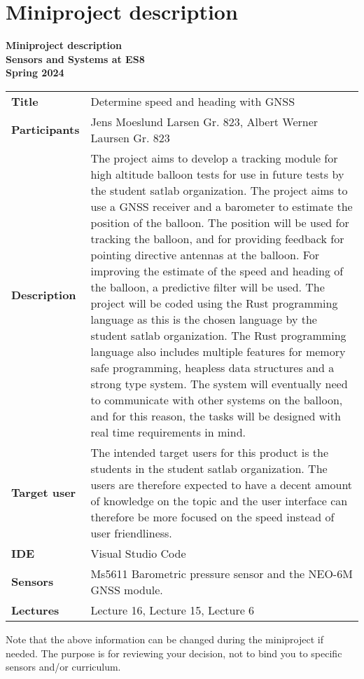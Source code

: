 \chapter{Miniproject description}\label{ch:miniproject_description}
\begin{center}
    \bf
    Miniproject description \\ Sensors and Systems at ES8 \\Spring 2024
    \end{center}
    
    \begin{tabularx}{\linewidth}{lX}
    \bf Title & Determine speed and heading with GNSS \\
    \bf Participants & Jens Moeslund Larsen Gr. 823, Albert Werner Laursen Gr. 823  \\
    \bf Description & The project aims to develop a tracking module for high altitude balloon tests for use in future tests by the student satlab organization. The project aims to use a GNSS receiver and a barometer to estimate the position of the balloon. The position will be used for tracking the balloon, and for providing feedback for pointing directive antennas at the balloon. For improving the estimate of the speed and heading of the balloon, a predictive filter will be used. The project will be coded using the Rust programming language as this is the chosen language by the student satlab organization. The Rust programming language also includes multiple features for memory safe programming, heapless data structures and a strong type system. The system will eventually need to communicate with other systems on the balloon, and for this reason, the tasks will be designed with real time requirements in mind.\\
    \bf Target user & The intended target users for this product is the students in the student satlab organization. The users are therefore expected to have a decent amount of knowledge on the topic and the user interface can therefore be more focused on the speed instead of user friendliness. \\
    \bf IDE & Visual Studio Code \\
    \bf Sensors & Ms5611 Barometric pressure sensor and the NEO-6M GNSS module. \\
    \bf Lectures & Lecture 16, Lecture 15, Lecture 6 \\
    \end{tabularx}
    
    Note that the above information can be changed during the miniproject if needed. The purpose is for reviewing your decision, not to bind you to specific sensors and/or curriculum.